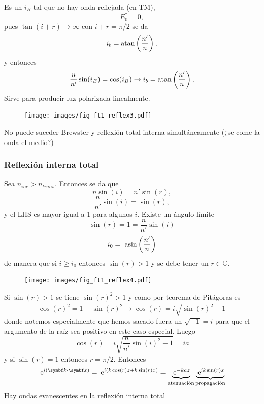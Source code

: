 \documentclass[10pt,oneside]{CBFT_book}
\begin{document}
Es un $i_B$ tal que no hay onda  reflejada (en TM),
\[
	E_0^{''} = 0,
\]
pues $\tan( i + r) \to \infty$ con $i+r =\pi/2$ se da
\[
	i_b = \mathrm{ atan } \left( \frac{n'}{n}\right) ,
\]
y entonces 
\[
	\frac{n}{n'}\sin(i_B) = \cos(i_B) \rightarrow i_b = \mathrm{ atan }\left( \frac{n'}{n}\right),
\]
Sirve para producir luz polarizada linealmente.

\begin{figure}[htb]
	\begin{center}
	\texttt{[image: images/fig\_ft1\_reflex3.pdf]}	 
	\end{center}
	\caption{}
\end{figure} 

No puede suceder Brewster y reflexión total interna simultáneamente (¿se come la onda el medio?)

\subsubsection{Reflexión interna total}

Sea $ n_{inc} > n_{trans} $. Entonces se da que
\[
	n \sin(i) = n'\sin(r),
\]
\[
	\frac{n}{n'} \sin(i) = \sin(r),
\]
y el LHS es mayor igual a 1 para algunos $i$. Existe un ángulo límite 
\[
	\sin(r) = 1 = \frac{n}{n'} \sin(i) 
\]
\[
	i_0 = \text{ asin}\left( \frac{n'}{n} \right)
\]
de manera que si $i \geq i_0$ entonces $\sin(r) > 1$ y se debe tener un $r\in \mathbb{C}$.

\begin{figure}[htb]
	\begin{center}
	\texttt{[image: images/fig\_ft1\_reflex4.pdf]}	 
	\end{center}
	\caption{}
\end{figure} 


Si $\sin(r)>1$ se tiene $\sin(r)^2 > 1$ y como por teorema de Pitágoras es 
\[
	\cos(r)^2 = 1 - \sin(r)^2 \rightarrow \cos(r) = i \sqrt{ \sin(r)^2 - 1 }
\]
donde notemos especialmente que hemos sacado fuera un $\sqrt{-1} = i$ para que el argumento 
de la raíz sea positivo en este caso especial. Luego 
\[
	\cos(r) = i \sqrt{ \frac{n}{n'}\sin(i)^2 - 1 } = i a 
\]
y si $\sin(r) = 1$ entonces $r = \pi/2$.
Entonces
\[
	\euler^{i(\vb{k}\cdot\vb{x})} = \euler^{i(k \cos(r)z + k \sin(r)x)} =
		\underbrace{\euler^{-kaz}}_{\text{atenuación}} 
		\underbrace{\euler^{ik\sin(r)x}}_{\text{propagación}}
\]
Hay ondas evanescentes en la reflexión interna total
\end{document}
